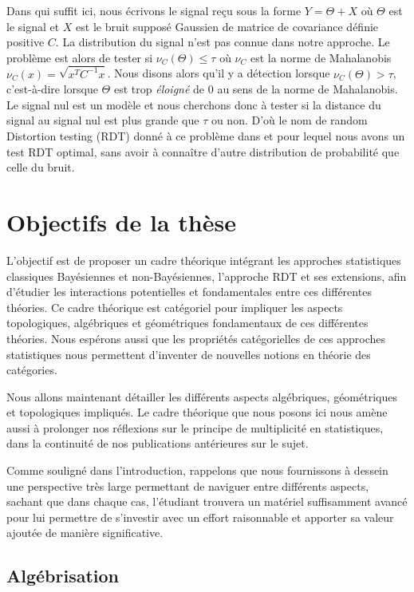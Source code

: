 \documentclass[a4paper, 10pt]{article}
\begin{document}
Dans \cite{pastorRandomDistortionTesting2013} qui suffit ici, nous écrivons le signal reçu sous la forme $Y = \Theta + X$ où $\Theta$ est le signal et $X$ est le bruit supposé Gaussien de matrice de covariance définie positive $C$. La distribution du signal n'est pas connue dans notre approche. Le problème est alors de tester si $\nu_C(\Theta) \leq \tau$ où $\nu_C$ est la norme de Mahalanobis $\nu_C(x) = \sqrt{x^T C^{-1} x}$. Nous disons alors qu'il y a détection lorsque $\nu_C(\Theta) > \tau$, c'est-à-dire lorsque $\Theta$ est trop \emph{éloigné} de $0$ au sens de la norme de Mahalanobis. Le signal nul est un modèle et nous cherchons donc à tester si la distance du signal au signal nul est plus grande que $\tau$ ou non. D'où le nom de random Distortion testing (RDT) donné à ce problème dans \cite{pastorRandomDistortionTesting2013} et pour lequel nous avons un test RDT optimal, sans avoir à connaître d'autre distribution de probabilité que celle du bruit.

\section{Objectifs de la thèse}

L'objectif est de proposer un cadre théorique intégrant les approches statistiques classiques Bayésiennes et non-Bayésiennes, l'approche RDT et ses extensions, afin d'étudier les interactions potentielles et fondamentales entre ces différentes théories. Ce cadre théorique est catégoriel pour impliquer les aspects topologiques, algébriques et géométriques fondamentaux de ces différentes théories. Nous espérons aussi que les propriétés catégorielles de ces approches statistiques nous permettent d'inventer de nouvelles notions en théorie des catégories. 

Nous allons maintenant détailler les différents aspects algébriques, géométriques et topologiques impliqués. Le cadre théorique que nous posons ici nous amène aussi à prolonger nos réflexions sur le principe de multiplicité en statistiques, dans la continuité de nos publications antérieures sur le sujet.

Comme souligné dans l'introduction, rappelons que nous fournissons à dessein une perspective très large permettant de naviguer entre différents aspects, sachant que dans chaque cas, l'étudiant trouvera un matériel suffisamment avancé pour lui permettre de s'investir avec un effort raisonnable et apporter sa valeur ajoutée de manière significative.

\subsection{Algébrisation}
\end{document}
